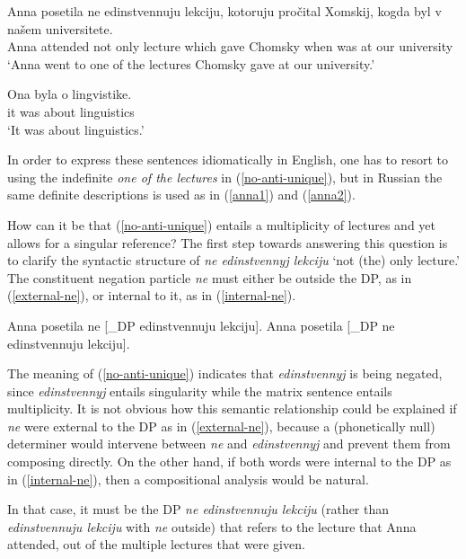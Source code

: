 \begin{exe}
	\ex \label{no-anti-unique} \begin{xlist}
		\ex \gll Anna posetila ne edinstvennuju lekciju, kotoruju pro\v{c}ital Xomskij, kogda byl v na\v{s}em universitete.\\
		Anna attended not only lecture which gave Chomsky when was at our university\\
		\glt `Anna went to one of the lectures Chomsky gave at our university.'

		\ex \gll Ona byla o lingvistike.\\
		it was about linguistics\\
		\glt `It was about linguistics.'
	\end{xlist}
\end{exe}

In order to express these sentences idiomatically in English, one has to resort to using the indefinite \textit{one of the lectures} in (\ref{no-anti-unique}), but in Russian the same definite descriptions is used as in (\ref{anna1}) and (\ref{anna2}).

How can it be that (\ref{no-anti-unique}) entails a multiplicity of lectures and yet allows for a singular reference? The first step towards answering this question is to clarify the syntactic structure of \textit{ne edinstvennyj lekciju} `not (the) only lecture.' The constituent negation particle \textit{ne} must either be outside the DP, as in (\ref{external-ne}), or internal to it, as in (\ref{internal-ne}).

\begin{exe}
	\ex \label{external-ne} Anna posetila ne [_{DP} edinstvennuju lekciju].
	\ex \label{internal-ne} Anna posetila [_{DP} ne edinstvennuju lekciju].
\end{exe}

The meaning of (\ref{no-anti-unique}) indicates that \textit{edinstvennyj} is being negated, since \textit{edinstvennyj} entails singularity while the matrix sentence entails multiplicity. It is not obvious how this semantic relationship could be explained if \textit{ne} were external to the DP as in (\ref{external-ne}), because a (phonetically null) determiner would intervene between \textit{ne} and \textit{edinstvennyj} and prevent them from composing directly. On the other hand, if both words were internal to the DP as in (\ref{internal-ne}), then a compositional analysis would be natural.

In that case, it must be the DP \textit{ne edinstvennuju lekciju} (rather than \textit{edinstvennuju lekciju} with \textit{ne} outside) that refers to the lecture that Anna attended, out of the multiple lectures that were given.

